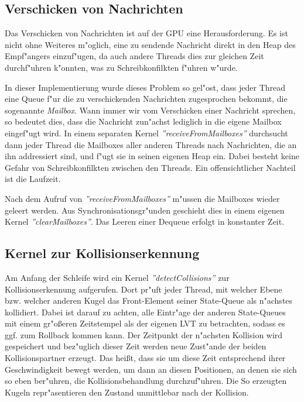 \documentclass[a4paper, 10pt, openright, parskip, chapterprefix]{scrreprt}
\begin{document}
\subsection{Verschicken von Nachrichten}
\label{subsec:VerschickenVonNachrichten}
Das Verschicken von Nachrichten ist auf der GPU eine Herausforderung. Es ist nicht ohne Weiteres m"oglich, eine zu sendende
Nachricht direkt in den Heap des Empf"angers einzuf"ugen, da auch andere Threads dies zur gleichen Zeit durchf"uhren
k"onnten, was zu Schreibkonfilkten f"uhren w"urde.

In dieser Implementierung wurde dieses Problem so gel"ost, dass jeder Thread eine Queue f"ur die zu verschickenden
Nachrichten zugesprochen bekommt, die sogenannte \emph{Mailbox}. Wann immer wir vom Verschicken einer Nachricht
sprechen, so bedeutet dies, dass die Nachricht zun"achst lediglich in die eigene Mailbox eingef"ugt wird.
In einem separaten
Kernel \emph{''receiveFromMailboxes''} durchsucht dann jeder Thread die Mailboxes aller anderen Threads nach
Nachrichten, die an ihn addressiert sind,
und f"ugt sie in seinen eigenen Heap ein. Dabei besteht keine Gefahr von Schreibkonfilkten zwischen den Threads.
Ein offensichtlicher Nachteil ist die Laufzeit.

Nach dem Aufruf von \emph{''receiveFromMailboxes''} m"ussen die Mailboxes wieder geleert werden. Aus
Synchronisationsgr"unden geschieht dies in einem eigenen Kernel \emph{''clearMailboxes''}. Das Leeren einer Dequeue
erfolgt in konstanter Zeit.


\subsection{Kernel zur Kollisionserkennung}
\label{subsec:KernelZurKollisionserkennung}
Am Anfang der Schleife wird ein Kernel \emph{''detectCollisions''} zur Kollisionserkennung aufgerufen. Dort pr"uft jeder Thread, mit welcher Ebene
bzw. welcher anderen Kugel das Front-Element seiner State-Queue als n"achstes kollidiert. Dabei ist
darauf zu achten, alle Eintr"age der anderen State-Queues mit einem
gr"o\ss eren Zeitstempel als der eigenen LVT zu betrachten, sodass es ggf. zum Rollback kommen kann. Der Zeitpunkt der n"achsten
Kollision wird gespeichert und bez"uglich dieser Zeit werden neue Zust"ande der beiden Kollisionspartner erzeugt. Das
hei\ss t, dass sie um diese Zeit entsprechend ihrer Geschwindigkeit bewegt werden, um dann an diesen Positionen, an
denen sie sich so eben ber"uhren, die Kollisionsbehandlung
durchzuf"uhren. Die So erzeugten Kugeln repr"asentieren den Zustand unmittlebar nach der Kollision.
\end{document}
